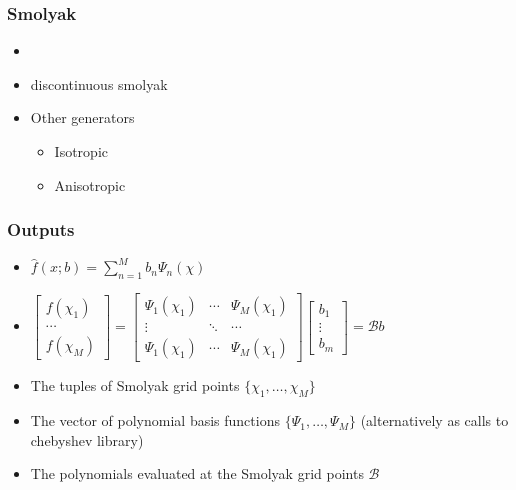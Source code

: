 \documentclass{beamer}
\begin{document}
\begin{frame}
  \frametitle{Smolyak }
  \begin{itemize}
  \item \item discontinuous smolyak
\item Other generators
  \begin{itemize}
  \item Isotropic 
  \item Anisotropic
  \end{itemize}
  \end{itemize}
\end{frame}

\begin{frame}
  \frametitle{Outputs}
  \begin{itemize}
  \item $\hat{f}(x;b)=\sum_{n=1}^M b_n \Psi_n(\chi)$
  \item $
    \begin{bmatrix}
      f(\chi_1)\\ \cdots \\       f(\chi_M)
    \end{bmatrix}=
      \begin{bmatrix}
        \Psi_1(\chi_1) &\cdots &        \Psi_M(\chi_1)\\
\vdots&\ddots&\cdots\\
        \Psi_1(\chi_1)& \cdots   &      \Psi_M(\chi_1)
      \end{bmatrix}
      \begin{bmatrix}
        b_1\\ \vdots \\ b_m
      \end{bmatrix}= \mathcal{B} b
$
  \item The tuples of Smolyak grid points $\{\chi_1, \ldots , \chi_M\}$
  \item The vector of polynomial basis functions $\{\Psi_1, \ldots , \Psi_M\}$ (alternatively as calls to chebyshev library)
  \item The polynomials evaluated at the Smolyak grid points $\mathcal{B}$
  \end{itemize}
\end{frame}
\end{document}

